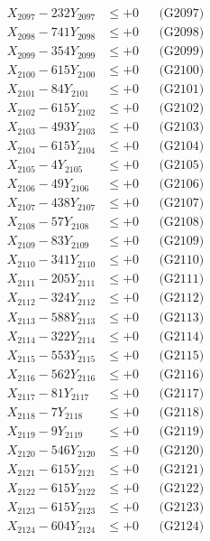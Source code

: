 \documentclass[a4paper,10pt]{article}
\begin{document}
{\begin{align}
X_{2097} - 232Y_{2097} &\leq +0 && \text{(G2097)} \\
X_{2098} - 741Y_{2098} &\leq +0 && \text{(G2098)} \\
X_{2099} - 354Y_{2099} &\leq +0 && \text{(G2099)} \\
X_{2100} - 615Y_{2100} &\leq +0 && \text{(G2100)} \\
\allowbreak
X_{2101} - 84Y_{2101} &\leq +0 && \text{(G2101)} \\
X_{2102} - 615Y_{2102} &\leq +0 && \text{(G2102)} \\
X_{2103} - 493Y_{2103} &\leq +0 && \text{(G2103)} \\
X_{2104} - 615Y_{2104} &\leq +0 && \text{(G2104)} \\
X_{2105} - 4Y_{2105} &\leq +0 && \text{(G2105)} \\
X_{2106} - 49Y_{2106} &\leq +0 && \text{(G2106)} \\
X_{2107} - 438Y_{2107} &\leq +0 && \text{(G2107)} \\
X_{2108} - 57Y_{2108} &\leq +0 && \text{(G2108)} \\
X_{2109} - 83Y_{2109} &\leq +0 && \text{(G2109)} \\
X_{2110} - 341Y_{2110} &\leq +0 && \text{(G2110)} \\
\allowbreak
X_{2111} - 205Y_{2111} &\leq +0 && \text{(G2111)} \\
X_{2112} - 324Y_{2112} &\leq +0 && \text{(G2112)} \\
X_{2113} - 588Y_{2113} &\leq +0 && \text{(G2113)} \\
X_{2114} - 322Y_{2114} &\leq +0 && \text{(G2114)} \\
X_{2115} - 553Y_{2115} &\leq +0 && \text{(G2115)} \\
X_{2116} - 562Y_{2116} &\leq +0 && \text{(G2116)} \\
X_{2117} - 81Y_{2117} &\leq +0 && \text{(G2117)} \\
X_{2118} - 7Y_{2118} &\leq +0 && \text{(G2118)} \\
X_{2119} - 9Y_{2119} &\leq +0 && \text{(G2119)} \\
X_{2120} - 546Y_{2120} &\leq +0 && \text{(G2120)} \\
\allowbreak
X_{2121} - 615Y_{2121} &\leq +0 && \text{(G2121)} \\
X_{2122} - 615Y_{2122} &\leq +0 && \text{(G2122)} \\
X_{2123} - 615Y_{2123} &\leq +0 && \text{(G2123)} \\
X_{2124} - 604Y_{2124} &\leq +0 && \text{(G2124)} \\

\end{align}}
\end{document}
